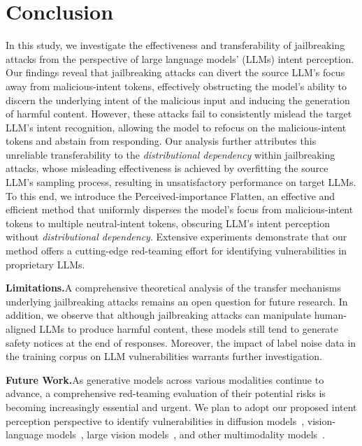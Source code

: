 \section{Conclusion}
In this study, we investigate the effectiveness and transferability of jailbreaking attacks from the perspective of large language models' (LLMs) intent perception.
Our findings reveal that jailbreaking attacks can divert the source LLM's focus away from malicious-intent tokens, effectively obstructing the model's ability to discern the underlying intent of the malicious input and inducing the generation of harmful content.
However, these attacks fail to consistently mislead the target LLM's intent recognition, allowing the model to refocus on the malicious-intent tokens and abstain from responding. 
Our analysis further attributes this unreliable transferability to the \emph{distributional dependency} within jailbreaking attacks, whose misleading effectiveness is achieved by overfitting the source LLM's sampling process, resulting in unsatisfactory performance on target LLMs.
To this end, we introduce the Perceived-importance Flatten, an effective and efficient method that uniformly disperses the model's focus from malicious-intent tokens to multiple neutral-intent tokens, obscuring LLM's intent perception without \emph{distributional dependency}.
Extensive experiments demonstrate that our method offers a cutting-edge red-teaming effort for identifying vulnerabilities in proprietary LLMs.

\textbf{Limitations.}\hspace*{2mm}A comprehensive theoretical analysis of the transfer mechanisms underlying jailbreaking attacks remains an open question for future research.
In addition, we observe that although jailbreaking attacks can manipulate human-aligned LLMs to produce harmful content, these models still tend to generate safety notices at the end of responses.
Moreover, the impact of label noise data \citep{yuan2023late, yuan2024early} in the training corpus on LLM vulnerabilities warrants further investigation.

\textbf{Future Work.}\hspace*{2mm}As generative models across various modalities continue to advance, a comprehensive red-teaming evaluation of their potential risks is becoming increasingly essential and urgent.
We plan to adopt our proposed intent perception perspective to identify vulnerabilities in diffusion models~\citep{luo2024deem, wan2024ted}, vision-language models~\citep{zhou2024few, luo2024mmevol, tu2024ranked}, large vision models~\citep{bai2024sequential, wang2024lavin}, and other multimodality models~\citep{huang2023machine, xia2024achieving, zhang2024hierarchical}.